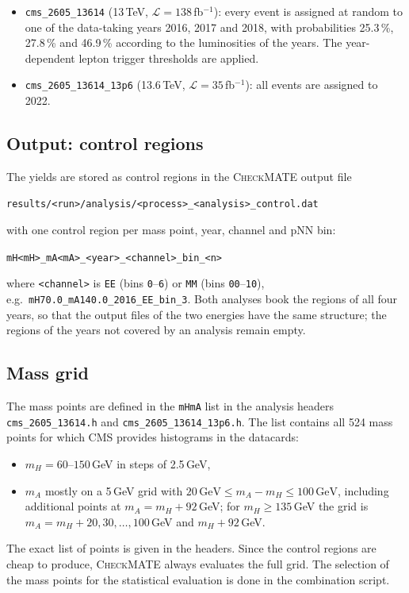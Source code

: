 \documentclass[11pt,a4paper]{article}
\newcommand{\cm}{\textsc{CheckMATE}}
\newcommand{\file}[1]{\texttt{#1}}
\begin{document}
\begin{itemize}
  \item \file{cms\_2605\_13614} (13\,TeV, $\mathcal{L}=138$\,fb$^{-1}$):
        every event is assigned at random to one of the data-taking years
        2016, 2017 and 2018, with probabilities 25.3\,\%, 27.8\,\% and
        46.9\,\% according to the luminosities of the years. The
        year-dependent lepton trigger thresholds are applied.
  \item \file{cms\_2605\_13614\_13p6} (13.6\,TeV, $\mathcal{L}=35$\,fb$^{-1}$):
        all events are assigned to 2022.
\end{itemize}

\subsection{Output: control regions}

The yields are stored as control regions in the \cm{} output file
\begin{center}
\file{results/<run>/analysis/<process>\_<analysis>\_control.dat}
\end{center}
with one control region per mass point, year, channel and pNN bin:
\begin{center}
\file{mH<mH>\_mA<mA>\_<year>\_<channel>\_bin\_<n>}
\end{center}
where \file{<channel>} is \file{EE} (bins \file{0}--\file{6}) or \file{MM}
(bins \file{00}--\file{10}), e.g.\ \file{mH70.0\_mA140.0\_2016\_EE\_bin\_3}.
Both analyses book the regions of all four years, so that the output files
of the two energies have the same structure; the regions of the years not
covered by an analysis remain empty.

\subsection{Mass grid}
\label{sec:grid}

The mass points are defined in the \texttt{mHmA} list in the analysis
headers \file{cms\_2605\_13614.h} and \file{cms\_2605\_13614\_13p6.h}. The
list contains all 524 mass points for which CMS provides histograms in the
datacards:
\begin{itemize}
  \item $m_H = 60$--$150$\,GeV in steps of 2.5\,GeV,
  \item $m_A$ mostly on a 5\,GeV grid with
        $20\,\mathrm{GeV} \le m_A - m_H \le 100\,\mathrm{GeV}$, including
        additional points at $m_A = m_H+92$\,GeV; for $m_H \ge 135$\,GeV the
        grid is $m_A = m_H+20, 30, \ldots, 100$\,GeV and $m_H+92$\,GeV.
\end{itemize}
The exact list of points is given in the headers.
Since the control regions are cheap to produce, \cm{} always evaluates the
full grid. The selection of the mass points for the statistical evaluation
is done in the combination script.
\end{document}
